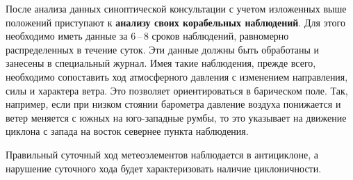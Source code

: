 \documentclass[a4paper, 12pt, twoside, final, book, russian, fittopage, cyremdash, openright]{ncc}
\newcommand{\otdo}{\,--\,}
\begin{document}
После анализа данных синоптической консультации с учетом изложенных
выше положений приступают к \textbf{анализу своих корабельных
  наблюдений}. Для этого необходимо иметь
данные за 6\otdo8 сроков наблюдений, равномерно распределенных в течение
суток. Эти данные должны быть обработаны и занесены в специальный
журнал. Имея такие наблюдения, прежде всего, необходимо сопоставить
ход атмосферного давления с изменением направления, силы и характера
ветра. Это позволяет ориентироваться в барическом поле. Так, например,
если при низком стоянии барометра давление воздуха понижается и ветер
меняется с южных на юго-западные румбы, то это указывает на движение
циклона с запада на восток севернее пункта наблюдения.

Правильный суточный ход метеоэлементов наблюдается в антициклоне, а
нарушение суточного хода будет характеризовать наличие циклоничности.



\backmatter{}

\printindex
\end{document}

